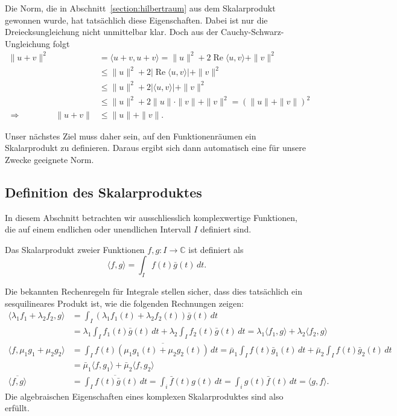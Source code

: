 Die Norm, die in Abschnitt~\ref{section:hilbertraum} aus dem Skalarprodukt
gewonnen wurde, hat tatsächlich diese Eigenschaften.
Dabei ist nur die Dreiecksungleichung nicht unmittelbar klar.
Doch aus der Cauchy-Schwarz-Ungleichung folgt
%
\begin{align*}
\| u + v \|^2
&=
\langle u+v,u+v\rangle
=
\| u \|^2 + 2\operatorname{Re} \langle u,v\rangle + \| v\|^2
\\
&\le
\| u \|^2 + 2|\operatorname{Re} \langle u,v\rangle| + \| v\|^2
\\
&\le
\| u \|^2 + 2|\langle u,v\rangle| + \| v\|^2
\\
&\le
\| u \|^2 + 2\| u \| \cdot \|v\| + \| v\|^2
=
(\|u\| + \| v \|)^2
\\
\Rightarrow\qquad\qquad
\|u+v\|
&\le
\|u\| + \|v\|.
\end{align*}

Unser nächstes Ziel muss daher sein, auf den Funktionenräumen ein
Skalarprodukt zu definieren.
Daraus ergibt sich dann automatisch eine für unsere Zwecke geeignete
Norm.

\subsection{Definition des Skalarproduktes}
In diesem Abschnitt betrachten wir ausschliesslich komplexwertige Funktionen,
die auf einem endlichen oder unendlichen Intervall $I$ definiert sind.

\begin{definition}
\label{l2:definition:skalarprodukt}
%
Das Skalarprodukt zweier Funktionen $f,g\colon I\to\mathbb C$ ist definiert
als
\begin{equation}
\langle f,g\rangle
=
\int_I f(t) \bar{g}(t)\,dt.
\label{l2:formel:skalarprodukt}
\end{equation}
\end{definition}

Die bekannten Rechenregeln für Integrale stellen sicher, dass dies
tatsächlich ein sesquilineares Produkt ist, wie die folgenden Rechnungen
zeigen:
\begin{align*}
\langle \lambda_1 f_1+\lambda_2 f_2,g\rangle
&=
\int_I (\lambda_1 f_1(t) + \lambda_2 f_2(t))\bar{g}(t)\,dt
\\
&=
\lambda_1 \int_I f_1(t) \bar{g}(t)\,dt + \lambda_2 \int_I f_2(t)\bar{g}(t)\,dt
= \lambda_1 \langle f_1,g\rangle + \lambda_2 \langle f_2,g\rangle
\\
\langle f,\mu_1 g_1 + \mu_2 g_2\rangle
&=
\int_I f(t) \overline{(\mu_1 g_1(t) + \mu_2 g_2(t))}\,dt
=
\bar{\mu}_1 \int_I f(t) \bar{g}_1(t)\,dt
+
\bar{\mu}_2 \int_I f(t) \bar{g}_2(t)\,dt
\\
&=
\bar{\mu}_1 \langle f,g_1\rangle
+
\bar{\mu}_2 \langle f,g_2\rangle
\\
\overline{
\langle f,g\rangle
}
&=
\overline{ \int_I f(t)\bar{g}(t)\,dt}
=
\int_i \bar{f}(t) g(t)\,dt
=
\int_i g(t) \bar{f}(t)\,dt
=
\langle g,f\rangle.
\end{align*}
Die algebraischen Eigenschaften eines komplexen Skalarproduktes sind
also erfüllt.

